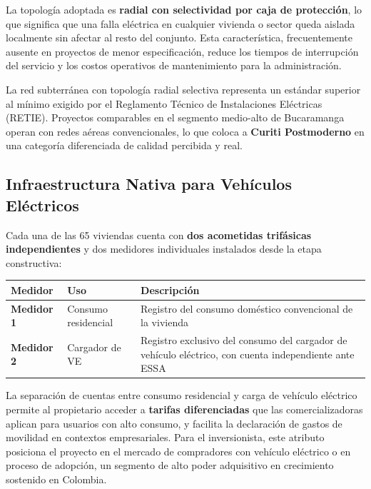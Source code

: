 La topolog\'ia adoptada es \textbf{radial con selectividad por
caja de protecci\'on}, lo que significa que una falla el\'ectrica
en cualquier vivienda o sector queda aislada localmente sin
afectar al resto del conjunto. Esta caracter\'istica,
frecuentemente ausente en proyectos de menor especificaci\'on,
reduce los tiempos de interrupci\'on del servicio y los costos
operativos de mantenimiento para la administraci\'on.

\begin{insightbox}
La red subterr\'anea con topolog\'ia radial selectiva representa
un est\'andar superior al m\'inimo exigido por el Reglamento
T\'ecnico de Instalaciones El\'ectricas (RETIE). Proyectos
comparables en el segmento medio-alto de Bucaramanga operan con
redes a\'ereas convencionales, lo que coloca a \textbf{Curiti Postmoderno} en una categor\'ia diferenciada de calidad
percibida y real.
\end{insightbox}

\subsection{Infraestructura Nativa para Veh\'iculos El\'ectricos}

Cada una de las 65 viviendas cuenta con \textbf{dos acometidas
trif\'asicas independientes} y dos medidores individuales
instalados desde la etapa constructiva:

\begin{center}
\begin{tabular}{
  >{\bfseries}l
  >{\centering\arraybackslash}p{4cm}
  p{6.5cm}}
  \toprule
  Medidor & Uso & Descripci\'on \\
  \midrule
  Medidor 1 &
    Consumo residencial &
    Registro del consumo dom\'estico
    convencional de la vivienda \\
  \rowcolor{NavyDeep!6!white}
  Medidor 2 &
    Cargador de VE &
    Registro exclusivo del consumo del
    cargador de veh\'iculo el\'ectrico,
    con cuenta independiente ante ESSA \\
  \bottomrule
\end{tabular}
\end{center}

\vspace{6pt}

La separaci\'on de cuentas entre consumo residencial y carga
de veh\'iculo el\'ectrico permite al propietario acceder a
\textbf{tarifas diferenciadas} que las comercializadoras aplican
para usuarios con alto consumo, y facilita la declaraci\'on de
gastos de movilidad en contextos empresariales. Para el
inversionista, este atributo posiciona el proyecto en el mercado
de compradores con veh\'iculo el\'ectrico o en proceso de
adopci\'on, un segmento de alto poder adquisitivo en crecimiento
sostenido en Colombia.

